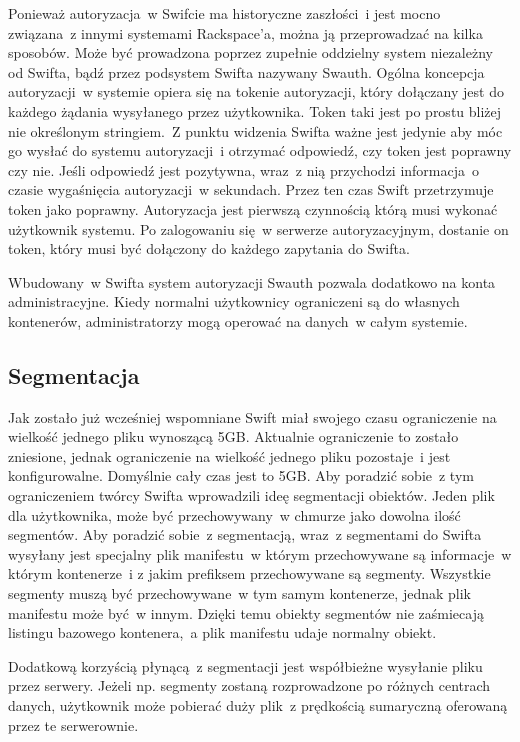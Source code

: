 Ponieważ autoryzacja~w Swifcie ma historyczne zaszłości~i jest mocno związana~z innymi systemami Rackspace'a, można ją przeprowadzać na kilka sposobów. Może być prowadzona poprzez zupełnie oddzielny system niezależny od Swifta, bądź przez podsystem Swifta nazywany Swauth. Ogólna koncepcja autoryzacji~w systemie opiera się na tokenie autoryzacji, który dołączany jest do każdego żądania wysyłanego przez użytkownika. Token taki jest po prostu bliżej nie określonym stringiem.~Z punktu widzenia Swifta ważne jest jedynie aby móc go wysłać do systemu autoryzacji~i otrzymać odpowiedź, czy token jest poprawny czy nie. Jeśli odpowiedź jest pozytywna, wraz~z nią przychodzi informacja~o czasie wygaśnięcia autoryzacji~w sekundach. Przez ten czas Swift przetrzymuje token jako poprawny. Autoryzacja jest pierwszą czynnością którą musi wykonać użytkownik systemu. Po zalogowaniu się~w serwerze autoryzacyjnym, dostanie on token, który musi być dołączony do każdego zapytania do Swifta.

Wbudowany~w Swifta system autoryzacji Swauth pozwala dodatkowo na konta administracyjne. Kiedy normalni użytkownicy ograniczeni są do własnych kontenerów, administratorzy mogą operować na danych~w całym systemie.

\subsection{Segmentacja}\label{sec:segmentacja}

Jak zostało już wcześniej wspomniane Swift miał swojego czasu ograniczenie na wielkość jednego pliku wynoszącą 5GB. Aktualnie ograniczenie to zostało zniesione, jednak ograniczenie na wielkość jednego pliku pozostaje~i jest konfigurowalne. Domyślnie cały czas jest to 5GB. Aby poradzić sobie~z tym ograniczeniem twórcy Swifta wprowadzili ideę segmentacji obiektów. Jeden plik dla użytkownika, może być przechowywany~w chmurze jako dowolna ilość segmentów. Aby poradzić sobie~z segmentacją, wraz~z segmentami do Swifta wysyłany jest specjalny plik manifestu~w którym przechowywane są informacje~w którym kontenerze~i z jakim prefiksem przechowywane są segmenty. Wszystkie segmenty muszą być przechowywane~w tym samym kontenerze, jednak plik manifestu może być~w innym. Dzięki temu obiekty segmentów nie zaśmiecają listingu bazowego kontenera,~a plik manifestu udaje normalny obiekt.

Dodatkową korzyścią płynącą~z segmentacji jest współbieżne wysyłanie pliku przez serwery. Jeżeli np. segmenty zostaną rozprowadzone po różnych centrach danych, użytkownik może pobierać duży plik~z prędkością sumaryczną oferowaną przez te serwerownie.

